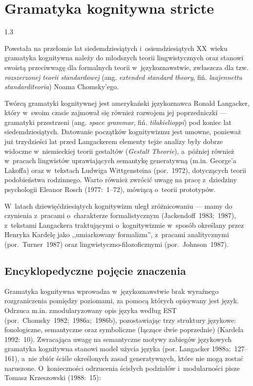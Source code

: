 \documentclass[11pt,a4paper,twoside]{report}
\begin{document}
\chapter{Gramatyka kognitywna stricte}
\begin{spacing}{1.3}

Powstała na przełomie lat siedemdziesiątych i~osiemdziesiątych XX~wieku gramatyka kognitywna należy do młodszych teorii lingwistycznych oraz stanowi swoistą przeciwwagę dla formalnych teorii w~językoznawstwie, zwłaszcza dla tzw. \emph{rozszerzonej teorii standardowej} (ang. \textit{extended standard theory}, fiń. \textit{laajennettu standarditeoria}) Noama Chomsky’ego.

Twórcą gramatyki kognitywnej jest amerykański językoznawca Ronald Langacker, który w~swoim czasie zajmował się również rozwojem jej poprzedniczki --- gramatyki przestrzeni (ang. \textit{space grammar}, fiń. \textit{tilakielioppi}) pod koniec lat siedemdziesiątych. Datowanie początków kognitywizmu jest umowne, ponieważ już trzydzieści lat przed Langackerem elementy tejże analizy były dobrze widoczne w~niemieckiej teorii gestaltów (\textit{Gestalt Theorie}), a~później również w~pracach lingwistów uprawiających semantykę generatywną (m.in. George'a Lakoffa) oraz w~tekstach Ludwiga Wittgensteina (por.~1972), dotyczących teorii podobieństwa rodzinnego. Warto również zwrócić uwagę na pracę z~dziedziny psychologii Eleanor Rosch (1977:~1--72), mówiącą o~teorii prototypów.

W~latach dziewięćdziesiątych kognitywizm uległ zróżnicowaniu --- mamy do czynienia z~pracami o~charakterze formalistycznym (Jackendoff~1983;~1987), z~tekstami Langackera traktującymi o~kognitywizmie w~sposób określany przez Henryka Kardelę jako ,,umiarkowany formalizm'', z~pracami analitycznymi (por.~Turner~1987) oraz lingwi\-styczno-filozoficznymi (por.~Johnson~1987).

\newpage

\section{Encyklopedyczne pojęcie znaczenia}

Gramatyka kognitywna wprowadza w~językoznawstwie brak wyraźnego rozgraniczenia pomiędzy poziomami, za pomocą których opisywany jest język. Odrzuca m.in. zmodularyzowany opis języka według EST (por.~Chomsky~1982;~1986a;~1986b), pozostawiając trzy struktury językowe: fonologiczne, semantyczne oraz symboliczne (łączące dwie poprzednie) (Kardela 1992:~10). Zwracająca uwagę na semantyczne motywy zabiegów językowych gramatyka kognitywna stanowi model użycia języka (por. Langacker 1988a:~127--161), a~nie zbiór ściśle określonych zasad generatywnych, które nie mogą zostać naruszone. O~konieczności odrzucenia ścisłych podziałów i~modularności pisze Tomasz Krzeszowski (1988:~15):
\end{spacing}
\end{document}
